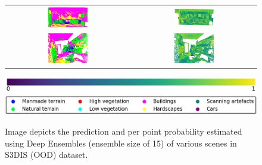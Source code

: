 \begin{figure}[h!]
\begin{tabular}{cc}
            \includegraphics[width=0.33\textwidth, height=0.18\textheight]{images/seg_output/s3dis_DE/S3DIS_3_Pred.pdf}& 
            \includegraphics[width=0.33\textwidth, height=0.18\textheight]{images/seg_output/s3dis_DE/S3DIS_3_prob.pdf}\\

            \includegraphics[width=0.33\textwidth, height=0.18\textheight]{images/seg_output/s3dis_DE/S3DIS_4_Pred.pdf}& 
            \includegraphics[width=0.33\textwidth, height=0.18\textheight]{images/seg_output/s3dis_DE/S3DIS_4_prob.pdf}\\
        \end{tabular}
        \includegraphics[scale=0.45]{images/prob_legend.pdf}
        \includegraphics[scale=0.45]{images/legend.png}
        \caption{Image depicts the prediction and per point probability estimated using Deep Ensembles (ensemble size of 15) of various scenes in S3DIS (OOD) dataset.}
        \label{fig:de_s3dis_probmap}
    \end{figure}

